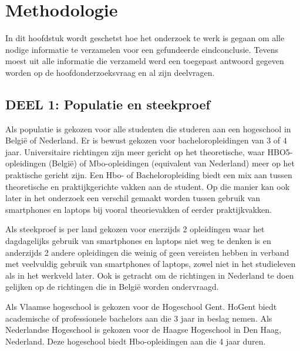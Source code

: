 
\chapter{Methodologie}
\label{ch:methodologie}

In dit hoofdstuk wordt geschetst hoe het onderzoek te werk is gegaan om alle nodige informatie te verzamelen voor een gefundeerde eindconclusie. Tevens moest uit alle informatie die verzameld werd een toegepast antwoord gegeven worden op de hoofdonderzoeksvraag en al zijn deelvragen.

\section{DEEL 1: Populatie en steekproef}
\label{sec:popsteek}

Als populatie is gekozen voor alle studenten die studeren aan een hogeschool in België of Nederland. Er is bewust gekozen voor bacheloropleidingen van 3 of 4 jaar. Universitaire richtingen zijn meer gericht op het theoretische, waar HBO5-opleidingen (België) of Mbo-opleidingen (equivalent van Nederland) meer op het praktische gericht zijn. Een Hbo- of Bacheloropleiding biedt een mix aan tussen theoretische en praktijkgerichte vakken aan de student. Op die manier kan ook later in het onderzoek een verschil gemaakt worden tussen gebruik van smartphones en laptops bij vooral theorievakken of eerder praktijkvakken. 

Als steekproef is per land gekozen voor enerzijds 2 opleidingen waar het dagdagelijks gebruik van smartphones en laptops niet weg te denken is en anderzijds 2 andere opleidingen die weinig of geen vereisten hebben in verband met veelvuldig gebruik van smartphones of laptops, zowel niet in het studieleven als in het werkveld later. Ook is getracht om de richtingen in Nederland te doen gelijken op de richtingen die in België worden ondervraagd.

Als Vlaamse hogeschool is gekozen voor de Hogeschool Gent. HoGent biedt academische of professionele bachelors aan die 3 jaar in beslag nemen. Als Nederlandse Hogeschool is gekozen voor de Haagse Hogeschool in Den Haag, Nederland. Deze hogeschool biedt Hbo-opleidingen aan die 4 jaar duren.


